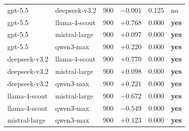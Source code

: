 \begin{table}[t]
\begin{tabular}{llrrrl}
gpt-5.5        & deepseek-v3.2  & 900 & $-0.001$ & 0.125 & no \\
gpt-5.5        & llama-4-scout  & 900 & $+0.768$ & 0.000 & \textbf{yes} \\
gpt-5.5        & mistral-large  & 900 & $+0.097$ & 0.000 & \textbf{yes} \\
gpt-5.5        & qwen3-max      & 900 & $+0.220$ & 0.000 & \textbf{yes} \\
deepseek-v3.2  & llama-4-scout  & 900 & $+0.770$ & 0.000 & \textbf{yes} \\
deepseek-v3.2  & mistral-large  & 900 & $+0.098$ & 0.000 & \textbf{yes} \\
deepseek-v3.2  & qwen3-max      & 900 & $+0.221$ & 0.000 & \textbf{yes} \\
llama-4-scout  & mistral-large  & 900 & $-0.672$ & 0.000 & \textbf{yes} \\
llama-4-scout  & qwen3-max      & 900 & $-0.549$ & 0.000 & \textbf{yes} \\
mistral-large  & qwen3-max      & 900 & $+0.123$ & 0.000 & \textbf{yes} \\
\bottomrule
\end{tabular}
\end{table}

